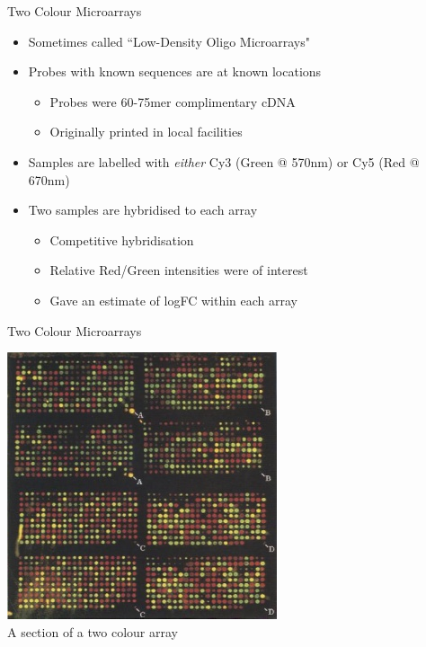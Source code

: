 \documentclass[aspectratio=169,11pt]{beamer}
\begin{document}
\begin{frame}{Two Colour Microarrays}

	\begin{itemize}
		\item Sometimes called ``Low-Density Oligo Microarrays"
		\item Probes with known sequences are at known locations
		\begin{itemize}
			\item Probes were 60-75mer complimentary cDNA
			\item Originally printed in local facilities
		\end{itemize}
		\item Samples are labelled with \textit{either} Cy3 (Green @ 570nm) or Cy5 (Red @ 670nm)
		\item Two samples are hybridised to each array
		\begin{itemize}
			\item Competitive hybridisation
			\item Relative Red/Green intensities were of interest
			\item Gave an estimate of logFC within each array		
		\end{itemize}
	\end{itemize}

\end{frame}

\begin{frame}{Two Colour Microarrays}

	\begin{center}
	\includegraphics[scale=0.5]{figures/2colour.jpg} 
	~\\
	A section of a two colour array
	\end{center}

\end{frame}
\end{document}
